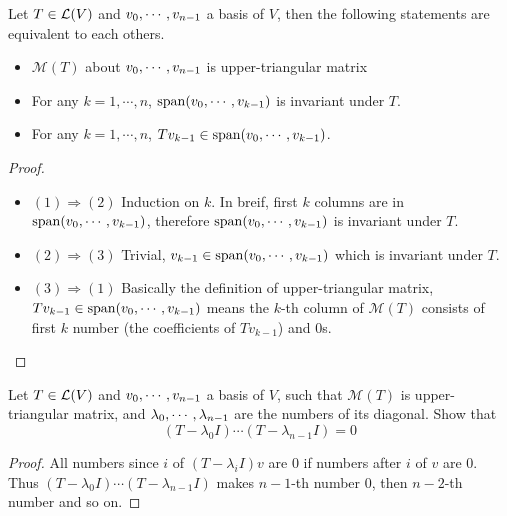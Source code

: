 \documentclass[../main.tex]{subfiles}
\begin{document}
\setcounter{theorem}{38}
\begin{theorem}
  \label{T5.39}
  Let $T \in \mathcal{L}(V)$ and $v_0 , \cdots , v_{n - 1}$ a basis of $V$, then the following
  statements are equivalent to each others.
  \begin{itemize}
    \item $\mathcal{M}(T)$ about $v_0 , \cdots , v_{n - 1}$ is upper-triangular matrix
    \item For any $k = 1, \cdots, n$, $\operatorname{span}(v_0 , \cdots , v_{k - 1})$ is invariant under $T$.
    \item For any $k = 1, \cdots, n$, $Tv_{k - 1} \in \operatorname{span}(v_0 , \cdots , v_{k - 1})$.
  \end{itemize}
\end{theorem}
\begin{proof}
  ~
  \begin{itemize}
    \item $(1) \Rightarrow (2)$ Induction on $k$. In breif, first $k$ columns
          are in $\operatorname{span}(v_0 , \cdots , v_{k - 1})$, therefore $\operatorname{span}(v_0 , \cdots , v_{k - 1})$
          is invariant under $T$.
    \item $(2) \Rightarrow (3)$ Trivial, $v_{k - 1} \in \operatorname{span}(v_0 , \cdots , v_{k - 1})$ which is invariant under $T$.
    \item $(3) \Rightarrow (1)$ Basically the definition of upper-triangular matrix, $Tv_{k - 1} \in \operatorname{span}(v_0 , \cdots , v_{k - 1})$
          means the $k$-th column of $\mathcal{M}(T)$ consists of first $k$ number (the coefficients of $Tv_{k - 1}$) and $0$s.
  \end{itemize}
\end{proof}

\begin{theorem}
  \label{T5.40}
  Let $T \in \mathcal{L}(V)$ and $v_0 , \cdots , v_{n - 1}$ a basis of $V$, such that $\mathcal{M}(T)$
  is upper-triangular matrix, and $\lambda_0 , \cdots , \lambda_{n - 1}$ are
  the numbers of its diagonal. Show that
  \[
  (T - \lambda_0 I) \cdots (T - \lambda_{n - 1}I) = 0
  \]
\end{theorem}
\begin{proof}
  All numbers since $i$ of $(T - \lambda_i I)v$ are $0$ if numbers after $i$ of $v$ are $0$.
  Thus $(T - \lambda_0 I) \cdots (T - \lambda_{n - 1}I)$ makes $n - 1$-th number $0$,
  then $n - 2$-th number and so on.
\end{proof}
\end{document}

